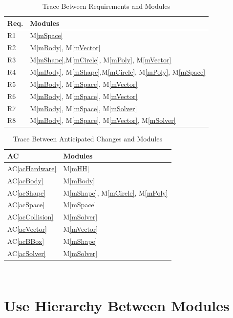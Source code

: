 \documentclass[12pt]{article}
\begin{document}
\begin{table}[h!]
\centering
\begin{tabular}{p{} p{}}
\toprule
\textbf{Req.} & \textbf{Modules}\\
\midrule
	R1 & M\ref{mSpace} \\
	R2 & M\ref{mBody}, M\ref{mVector} \\
	R3 & M\ref{mShape},M\ref{mCircle}, M\ref{mPoly}, M\ref{mVector} \\
	R4 & M\ref{mBody}, M\ref{mShape},M\ref{mCircle}, M\ref{mPoly}, M\ref{mSpace} \\
	R5 & M\ref{mBody}, M\ref{mSpace}, M\ref{mVector} \\
	R6 & M\ref{mBody}, M\ref{mSpace}, M\ref{mVector} \\
	R7 & M\ref{mBody}, M\ref{mSpace}, M\ref{mSolver}\\
	R8 & M\ref{mBody}, M\ref{mSpace}, M\ref{mVector},
	M\ref{mSolver} \\
\bottomrule
\end{tabular}
\caption{Trace Between Requirements and Modules}
\label{TblRT}
\end{table}

\begin{table}[h!]
\centering
\begin{tabular}{p{} p{}}
\toprule
	\textbf{AC} & \textbf{Modules}\\
\midrule
	AC\ref{acHardware} & M\ref{mHH} \\
	AC\ref{acBody} & M\ref{mBody} \\
	AC\ref{acShape} & M\ref{mShape}, M\ref{mCircle}, M\ref{mPoly} \\
	AC\ref{acSpace} & M\ref{mSpace} \\
	AC\ref{acCollision} & M\ref{mSolver} \\
	AC\ref{acVector} & M\ref{mVector} \\
	AC\ref{acBBox} & M\ref{mShape} \\
	AC\ref{acSolver} & M\ref{mSolver} \\

\bottomrule
\end{tabular}
\caption{Trace Between Anticipated Changes and Modules}
\label{TblAT}
\end{table}

~\newpage

\section{Use Hierarchy Between Modules} \label{SecUse}
\end{document}
